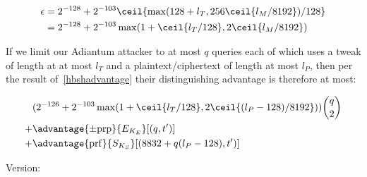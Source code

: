\documentclass[journal=tosc,preprint,floatrow,submission]{iacrtrans}
\begin{document}
\begin{align*}
\epsilon &= 2^{-128} + 2^{-103}\ceil{\max(128 + l_T, 256\ceil{l_M/8192})/128}  \\
&= 2^{-128} + 2^{-103}\max(1 + \ceil{l_T/128}, 2\ceil{l_M/8192})
\end{align*}

If we limit our Adiantum attacker to at most $q$ queries each of which uses a tweak of length at
at most $l_T$ and a plaintext/ciphertext of length at most $l_P$, then per the result
of~\autoref{hbshadvantage} their distinguishing advantage is therefore at most:

\begin{align*}
&( 2^{-126} + 2^{-103}\max(1 + \ceil{l_T/128}, 2\ceil{(l_P - 128)/8192}))\binom{q}{2} \\
+& \advantage{\pm \mathrm{prp}}{E_{K_E}}[(q, t')] \\
+& \advantage{\mathrm{prf}}{S_{K_S}}[(8832 + q(l_P - 128), t')] \\
\end{align*}

Version: \texttt{}
\end{document}

